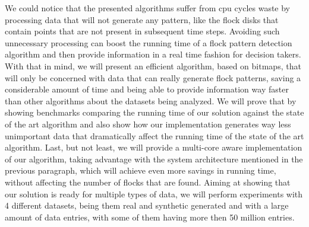 We could notice that the presented algorithms suffer from \ac{cpu} cycles waste by processing data that will not
generate any pattern, like the flock disks that contain points that are not present in subsequent time steps. Avoiding
such unnecessary processing can boost the running time of a flock pattern detection algorithm and then provide
information in a real time fashion for decision takers. With that in mind, we will present an efficient algorithm, based
on bitmaps, that will only be concerned with data that can really generate flock patterns, saving a considerable amount
of time and being able to provide information way faster than other algorithms about the datasets being analyzed. We
will prove that by showing benchmarks comparing the running time of our solution against the state of the art algorithm
and also show how our implementation generates way less unimportant data that dramatically affect the running time of
the state of the art algorithm. Last, but not least, we will provide a multi-core aware implementation of our algorithm,
taking advantage with the system architecture mentioned in the previous paragraph, which will achieve even more savings
in running time, without affecting the number of flocks that are found. Aiming at showing that our solution is ready for
multiple types of data, we will perform experiments with 4 different datasets, being them real and synthetic generated
and with a large amount of data entries, with some of them having more then 50 million entries.
